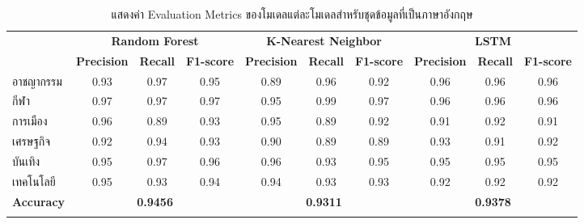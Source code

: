 \documentclass[12pt,oneside,openright,a4paper]{cpe-thai-project}
\begin{document}
      \begin{longtable}[!ht]{lccccccccc}
        \caption{แสดงค่า Evaluation Metrics ของโมเดลแต่ละโมเดลสำหรับชุดข้อมูลที่เป็นภาษาอังกฤษ}
        \label{tbl:class_report_eng}\\
        \hhline{==========}
        \multirow{2}{*}{\textbf{หมวดหมู่}} & \multicolumn{3}{c}{\textbf{Random Forest}} & \multicolumn{3}{c}{\textbf{K-Nearest Neighbor}} & \multicolumn{3}{c}{\textbf{LSTM}}  \\
         &
          \multicolumn{1}{l}{\textbf{Precision}} &
          \multicolumn{1}{l}{\textbf{Recall}} &
          \multicolumn{1}{l}{\textbf{F1-score}} &
          \multicolumn{1}{l}{\textbf{Precision}} &
          \multicolumn{1}{l}{\textbf{Recall}} &
          \multicolumn{1}{l}{\textbf{F1-score}} &
          \multicolumn{1}{l}{\textbf{Precision}} &
          \multicolumn{1}{l}{\textbf{Recall}} &
          \multicolumn{1}{l}{\textbf{F1-score}} \\ \hline
          \endhead
          \hline
          \endfoot
          \endlastfoot
          อาชญากรรม                       &  0.93        &  0.97        &  0.95        & 0.89        & 0.96        & 0.92       & 0.96       & 0.96      & 0.96      \\
          กีฬา                             &  0.97        &  0.97        &  0.97        & 0.95        & 0.99        & 0.97       & 0.96       & 0.96      & 0.96      \\
          การเมือง                          &  0.96        &  0.89        &  0.93        & 0.95        & 0.89        & 0.92       & 0.91       & 0.92      & 0.91      \\
          เศรษฐกิจ                            &  0.92        &  0.94        &  0.93        &  0.90        & 0.89        & 0.89       & 0.93       & 0.91      & 0.92      \\
          บันเทิง                           &  0.95        &  0.97        &  0.96        & 0.96         & 0.93        & 0.95       & 0.95       & 0.95      & 0.95      \\
          เทคโนโลยี                        &  0.95        &  0.93        &  0.94        & 0.94         & 0.93        & 0.93       & 0.92       & 0.92      & 0.92      \\ \hline
          \textbf{Accuracy}               & \multicolumn{3}{c}{\textbf{0.9456}}        & \multicolumn{3}{c}{\textbf{0.9311}}     & \multicolumn{3}{c}{\textbf{0.9378}} \\ \hhline{==========}
      \end{longtable}
\end{document}
